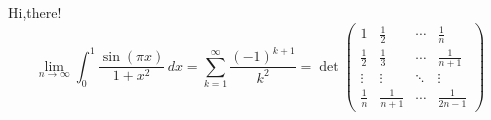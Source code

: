 \documentclass{cumcmthesis}
\begin{document}
\maketitle



Hi,there!
\[
\lim_{n \to \infty} \int_{0}^{1} \frac{\sin(\pi x)}{1+x^2} \, dx = \sum_{k=1}^{\infty} \frac{(-1)^{k+1}}{k^2} = \det\!\begin{pmatrix} 1 & \tfrac{1}{2} & \cdots & \tfrac{1}{n} \\[6pt] \tfrac{1}{2} & \tfrac{1}{3} & \cdots & \tfrac{1}{n+1} \\[6pt] \vdots & \vdots & \ddots & \vdots \\[6pt] \tfrac{1}{n} & \tfrac{1}{n+1} & \cdots & \tfrac{1}{2n-1} \end{pmatrix}
\]
\end{document}
